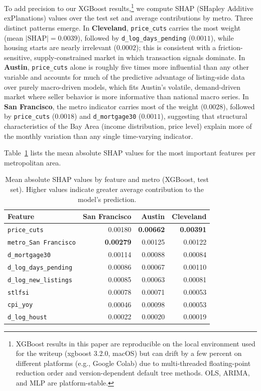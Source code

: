 To add precision to our XGBoost results,\footnote{XGBoost results in this paper are reproducible on the local environment used for the writeup (xgboost 3.2.0, macOS) but can drift by a few percent on different platforms (e.g., Google Colab) due to multi-threaded floating-point reduction order and version-dependent default tree methods. OLS, ARIMA, and MLP are platform-stable.} we compute SHAP (SHapley Additive exPlanations) values over the test set and average contributions by metro. Three distinct patterns emerge. In \textbf{Cleveland}, \texttt{price\_cuts} carries the most weight (mean $|\text{SHAP}|=0.0039$), followed by \texttt{d\_log\_days\_pending} ($0.0011$), while housing starts are nearly irrelevant ($0.0002$); this is consistent with a friction-sensitive, supply-constrained market in which transaction signals dominate. In \textbf{Austin}, \texttt{price\_cuts} alone is roughly five times more influential than any other variable and accounts for much of the predictive advantage of listing-side data over purely macro-driven models, which fits Austin's volatile, demand-driven market where seller behavior is more informative than national macro series. In \textbf{San Francisco}, the metro indicator carries most of the weight ($0.0028$), followed by \texttt{price\_cuts} ($0.0018$) and \texttt{d\_mortgage30} ($0.0011$), suggesting that structural characteristics of the Bay Area (income distribution, price level) explain more of the monthly variation than any single time-varying indicator.

Table~\ref{tab:shap} lists the mean absolute SHAP values for the most important features per metropolitan area.

\begin{table}[!htb]
\centering
\caption{Mean absolute SHAP values by feature and metro 
(XGBoost, test set). Higher values indicate greater average 
contribution to the model's prediction.}
\label{tab:shap}
\begin{tabular}{lrrr}
\hline
Feature & San Francisco & Austin & Cleveland \\
\hline
\texttt{price\_cuts}           & 0.00180 & \textbf{0.00662} & \textbf{0.00391} \\
\texttt{metro\_San Francisco}  & \textbf{0.00279} & 0.00125 & 0.00122 \\
\texttt{d\_mortgage30}         & 0.00114 & 0.00088 & 0.00084 \\
\texttt{d\_log\_days\_pending} & 0.00086 & 0.00067 & 0.00110 \\
\texttt{d\_log\_new\_listings} & 0.00085 & 0.00063 & 0.00081 \\
\texttt{stlfsi}                & 0.00078 & 0.00071 & 0.00053 \\
\texttt{cpi\_yoy}              & 0.00046 & 0.00098 & 0.00053 \\
\texttt{d\_log\_houst}         & 0.00022 & 0.00020 & 0.00019 \\
\hline
\end{tabular}
\end{table}

